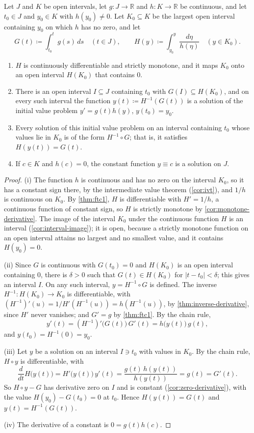 \begin{theorem}
\label{thm:separable}
Let $J$ and $K$ be open intervals, let $g\colon J\to\mathbb R$ and $h\colon K\to\mathbb R$ be continuous, and let $t_0\in J$ and $y_0\in K$ with $h(y_0)\ne0$. Let $K_0\subseteq K$ be the largest open interval containing $y_0$ on which $h$ has no zero, and let
\[
G(t)\coloneqq\int_{t_0}^tg(s)\,ds\quad(t\in J),\qquad H(y)\coloneqq\int_{y_0}^y\frac{d\eta}{h(\eta)}\quad(y\in K_0).
\]
\begin{enumerate}
\item $H$ is continuously differentiable and strictly monotone, and it maps $K_0$ onto an open interval $H(K_0)$ that contains $0$.
\item There is an open interval $I\subseteq J$ containing $t_0$ with $G(I)\subseteq H(K_0)$, and on every such interval the function $y(t)\coloneqq H^{-1}(G(t))$ is a solution of the initial value problem $y'=g(t)h(y)$, $y(t_0)=y_0$.
\item Every solution of this initial value problem on an interval containing $t_0$ whose values lie in $K_0$ is of the form $H^{-1}\circ G$; that is, it satisfies $H(y(t))=G(t)$.
\item If $c\in K$ and $h(c)=0$, the constant function $y\equiv c$ is a solution on $J$.
\end{enumerate}
\end{theorem}

\begin{proof}
(i) The function $h$ is continuous and has no zero on the interval $K_0$, so it has a constant sign there, by the intermediate value theorem (\cref{cor:ivt}), and $1/h$ is continuous on $K_0$. By \cref{thm:ftc1}, $H$ is differentiable with $H'=1/h$, a continuous function of constant sign, so $H$ is strictly monotone by \cref{cor:monotone-derivative}. The image of the interval $K_0$ under the continuous function $H$ is an interval (\cref{cor:interval-image}); it is open, because a strictly monotone function on an open interval attains no largest and no smallest value, and it contains $H(y_0)=0$.

(ii) Since $G$ is continuous with $G(t_0)=0$ and $H(K_0)$ is an open interval containing $0$, there is $\delta>0$ such that $G(t)\in H(K_0)$ for $|t-t_0|<\delta$; this gives an interval $I$. On any such interval, $y=H^{-1}\circ G$ is defined. The inverse $H^{-1}\colon H(K_0)\to K_0$ is differentiable, with $(H^{-1})'(u)=1/H'(H^{-1}(u))=h(H^{-1}(u))$, by \cref{thm:inverse-derivative}, since $H'$ never vanishes; and $G'=g$ by \cref{thm:ftc1}. By the chain rule,
\[
y'(t)=(H^{-1})'\bigl(G(t)\bigr)\,G'(t)=h\bigl(y(t)\bigr)\,g(t),
\]
and $y(t_0)=H^{-1}(0)=y_0$.

(iii) Let $y$ be a solution on an interval $I\ni t_0$ with values in $K_0$. By the chain rule, $H\circ y$ is differentiable, with
\[
\frac d{dt}H\bigl(y(t)\bigr)=H'\bigl(y(t)\bigr)\,y'(t)=\frac{g(t)\,h(y(t))}{h(y(t))}=g(t)=G'(t).
\]
So $H\circ y-G$ has derivative zero on $I$ and is constant (\cref{cor:zero-derivative}), with the value $H(y_0)-G(t_0)=0$ at $t_0$. Hence $H(y(t))=G(t)$ and $y(t)=H^{-1}(G(t))$.

(iv) The derivative of a constant is $0=g(t)h(c)$.
\end{proof}

